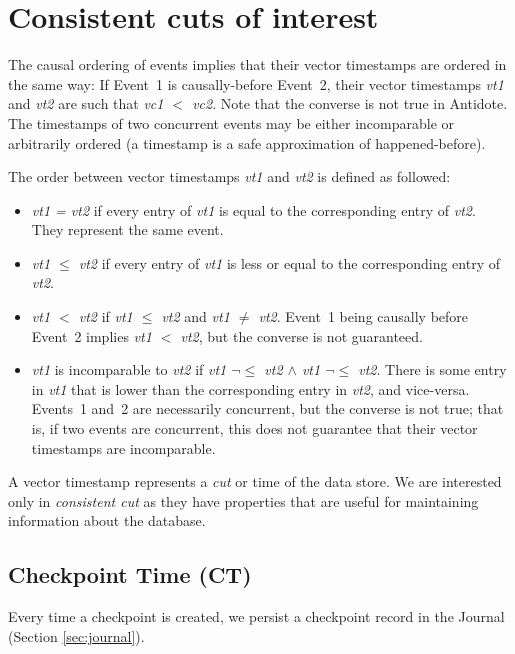 \documentclass[twoside]{article}
\begin{document}
\section{Consistent cuts of interest}
\label{sec:tcc-cuts}
The causal ordering of events implies that their vector timestamps are
ordered in the same way:
If Event~1 is causally-before Event~2, their vector timestamps
\emph{vt1} and \emph{vt2} are such that 
\emph{vc1 $<$ vc2}.
Note that the converse is not true in Antidote.
The timestamps of two
concurrent events may be either incomparable or arbitrarily ordered (a
timestamp is a safe approximation of happened-before).

The order between vector timestamps \emph{vt1} and \emph{vt2} is defined
as followed:
\begin{itemize}
\item
  \emph{vt1 = vt2} if every entry of \emph{vt1} is equal to the
  corresponding entry of \emph{vt2}.
  They represent the same event.
\item
  \emph{vt1 $\le$ vt2} if every entry of \emph{vt1} is less or equal to
  the corresponding entry of \emph{vt2}.
\item
  \emph{vt1 $<$ vt2} if \emph{vt1 $\le$ vt2} and \emph{vt1 $\neq$ vt2}.
  Event~1 being causally before Event~2 implies \emph{vt1 $<$ vt2}, but the converse
  is not guaranteed.
\item
  \emph{vt1} is incomparable to \emph{vt2} if \emph{vt1 $\neg\le$ vt2
    $\land$ vt1 $\neg\le$ vt2}.
  There is some entry in \emph{vt1} that is lower than the
  corresponding entry in \emph{vt2}, and vice-versa.
  Events~1 and~2 are necessarily concurrent, but the converse is not true;
  that is, if two events are concurrent, this does not guarantee
  that their vector timestamps are incomparable.
\end{itemize}
A vector timestamp represents a \emph{cut} or time of the data store.
We are interested only in \emph{consistent cut} as they have properties that are 
useful for maintaining information about the database.


\subsection{Checkpoint Time (CT)}
\label{sec:checkpoint-time}
Every time a checkpoint is created, we persist a checkpoint record in the Journal
(Section \ref{sec:journal}).
\end{document}

